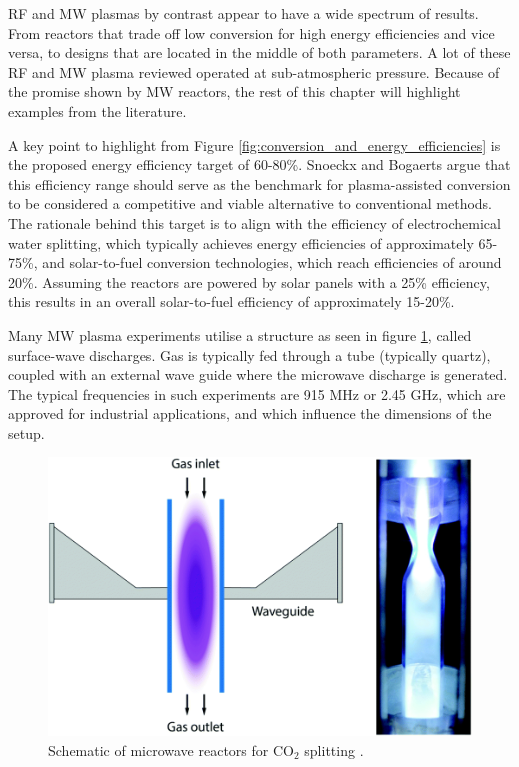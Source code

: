 RF and MW plasmas by contrast appear to have a wide spectrum of results. From reactors that trade off low conversion for high energy efficiencies and vice versa, to designs that are located in the middle of both parameters. A lot of these RF and MW plasma reviewed operated at sub-atmospheric pressure. Because of the promise shown by MW reactors, the rest of this chapter will highlight examples from the literature.

A key point to highlight from Figure \ref{fig:conversion_and_energy_efficiencies} is the proposed energy efficiency target of 60-80\%. Snoeckx and Bogaerts argue that this efficiency range should serve as the benchmark for plasma-assisted conversion to be considered a competitive and viable alternative to conventional methods. The rationale behind this target is to align with the efficiency of electrochemical water splitting, which typically achieves energy efficiencies of approximately 65-75\%, and solar-to-fuel conversion technologies, which reach efficiencies of around 20\%. Assuming the reactors are powered by solar panels with a 25\% efficiency, this results in an overall solar-to-fuel efficiency of approximately 15-20\%.

Many MW plasma experiments utilise a structure as seen in figure \ref{fig:mw_reactor}, called surface-wave discharges. Gas is typically fed through a tube (typically quartz), coupled with an external wave guide where the microwave discharge is generated. The typical frequencies in such experiments are 915 MHz or 2.45 GHz, which are approved for industrial applications, and which influence the dimensions of the setup. 

\begin{figure}[h!]
	\centering
	\includegraphics[width=0.8\linewidth]{chapter_3/figures/mw_reactor.png}
	\caption{Schematic of microwave reactors for CO$_2$ splitting \cite{Snoeckx2017}.}
	\label{fig:mw_reactor}
\end{figure}

